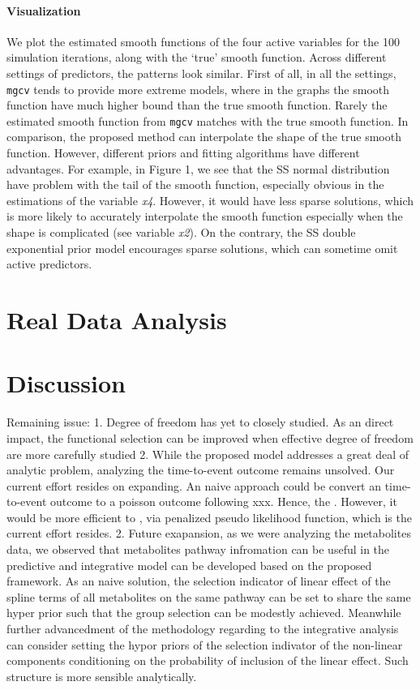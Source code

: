 \documentclass[AMA,STIX1COL,]{WileyNJD-v2}
\begin{document}
\hypertarget{visualization}{%
\paragraph{Visualization}\label{visualization}}

We plot the estimated smooth functions of the four active variables for
the 100 simulation iterations, along with the `true' smooth function.
Across different settings of predictors, the patterns look similar.
First of all, in all the settings, \texttt{mgcv} tends to provide more
extreme models, where in the graphs the smooth function have much higher
bound than the true smooth function. Rarely the estimated smooth
function from \texttt{mgcv} matches with the true smooth function. In
comparison, the proposed method can interpolate the shape of the true
smooth function. However, different priors and fitting algorithms have
different advantages. For example, in Figure 1, we see that the SS
normal distribution have problem with the tail of the smooth function,
especially obvious in the estimations of the variable \emph{x4}.
However, it would have less sparse solutions, which is more likely to
accurately interpolate the smooth function especially when the shape is
complicated (see variable \emph{x2}). On the contrary, the SS double
exponential prior model encourages sparse solutions, which can sometime
omit active predictors.

\hypertarget{real-data-analysis}{%
\section{Real Data Analysis}\label{real-data-analysis}}

\hypertarget{discussion}{%
\section{Discussion}\label{discussion}}

Remaining issue: 1. Degree of freedom has yet to closely studied. As an
direct impact, the functional selection can be improved when effective
degree of freedom are more carefully studied 2. While the proposed model
addresses a great deal of analytic problem, analyzing the time-to-event
outcome remains unsolved. Our current effort resides on expanding. An
naive approach could be convert an time-to-event outcome to a poisson
outcome following xxx. Hence, the . However, it would be more efficient
to , via penalized pseudo likelihood function, which is the current
effort resides. 2. Future exapansion, as we were analyzing the
metabolites data, we observed that metabolites pathway infromation can
be useful in the predictive and integrative model can be developed based
on the proposed framework. As an naive solution, the selection indicator
of linear effect of the spline terms of all metabolites on the same
pathway can be set to share the same hyper prior such that the group
selection can be modestly achieved. Meanwhile further advancedment of
the methodology regarding to the integrative analysis can consider
setting the hypor priors of the selection indivator of the non-linear
components conditioning on the probability of inclusion of the linear
effect. Such structure is more sensible analytically.
\end{document}
